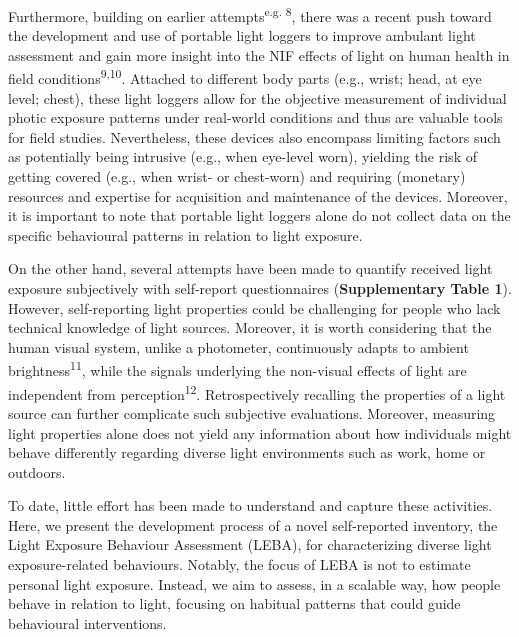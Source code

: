 \documentclass[
  man]{apa6}
\begin{document}
Furthermore, building on earlier attempts\textsuperscript{e.g. 8}, there was a recent push toward the development and use of portable light loggers to improve ambulant light assessment and gain more insight into the NIF effects of light on human health in field conditions\textsuperscript{9,10}. Attached to different body parts (e.g., wrist; head, at eye level; chest), these light loggers allow for the objective measurement of individual photic exposure patterns under real-world conditions and thus are valuable tools for field studies. Nevertheless, these devices also encompass limiting factors such as potentially being intrusive (e.g., when eye-level worn), yielding the risk of getting covered (e.g., when wrist- or chest-worn) and requiring (monetary) resources and expertise for acquisition and maintenance of the devices. Moreover, it is important to note that portable light loggers alone do not collect data on the specific behavioural patterns in relation to light exposure.

On the other hand, several attempts have been made to quantify received light exposure subjectively with self-report questionnaires (\textbf{Supplementary Table 1}). However, self-reporting light properties could be challenging for people who lack technical knowledge of light sources. Moreover, it is worth considering that the human visual system, unlike a photometer, continuously adapts to ambient brightness\textsuperscript{11}, while the signals underlying the non-visual effects of light are independent from perception\textsuperscript{12}. Retrospectively recalling the properties of a light source can further complicate such subjective evaluations. Moreover, measuring light properties alone does not yield any information about how individuals might behave differently regarding diverse light environments such as work, home or outdoors.

To date, little effort has been made to understand and capture these activities. Here, we present the development process of a novel self-reported inventory, the Light Exposure Behaviour Assessment (LEBA), for characterizing diverse light exposure-related behaviours. Notably, the focus of LEBA is not to estimate personal light exposure. Instead, we aim to assess, in a scalable way, how people behave in relation to light, focusing on habitual patterns that could guide behavioural interventions.
\end{document}
